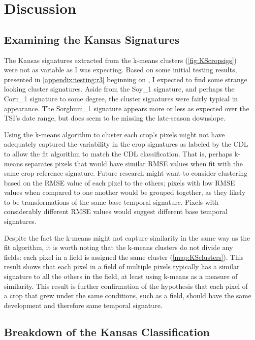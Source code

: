 \chapter{Discussion}

\section{Examining the Kansas Signatures}

The Kansas signatures extracted from the k-means clusters (\autoref{fig:KScropsigs}) were not as variable as I was expecting. Based on some initial testing results, presented in \autoref{appendix:testing:r3} beginning on , I expected to find some strange looking cluster signatures. Aside from the Soy\_1 signature, and perhaps the Corn\_1 signature to some degree, the cluster signatures were fairly typical in appearance. The Sorghum\_1 signature appears more or less as expected over the TSI's date range, but does seem to be missing the late-season downslope.

Using the k-means algorithm to cluster each crop's pixels might not have adequately captured the variability in the crop signatures as labeled by the CDL to allow the fit algorithm to match the CDL classification. That is, perhaps k-means separates pixels that would have similar RMSE values when fit with the same crop reference signature. Future research might want to consider clustering based on the RMSE value of each pixel to the others; pixels with low RMSE values when compared to one another would be grouped together, as they likely to be transformations of the same base temporal signature. Pixels with considerably different RMSE values would suggest different base temporal signatures.

Despite the fact the k-means might not capture similarity in the same way as the fit algorithm, it is worth noting that the k-means clusters do not divide any fields: each pixel in a field is assigned the same cluster (\autoref{map:KSclusters}). This result shows that each pixel in a field of multiple pixels typically has a similar signature to all the others in the field, at least using k-means as a measure of similarity. This result is further confirmation of the hypothesis that each pixel of a crop that grew under the same conditions, such as a field, should have the same development and therefore same temporal signature.

\section{Breakdown of the Kansas Classification}

